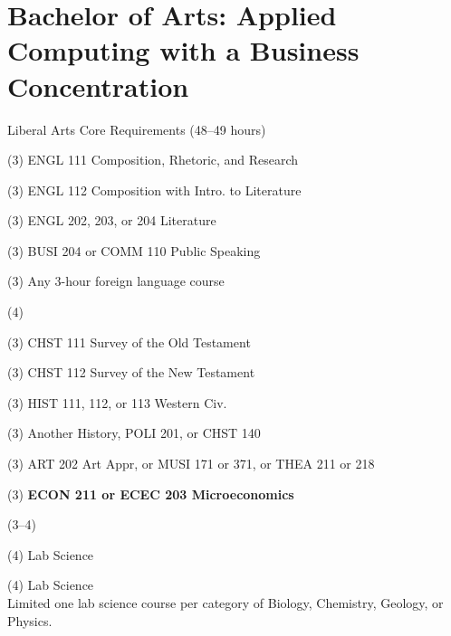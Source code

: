 \label{program:ba-app-bus}%
\section*{Bachelor of Arts: Applied Computing with a Business Concentration}

\begin{reqgroup}{Liberal Arts Core Requirements (48--49 hours)}
\begin{checklist}
\begin{minipage}[t]{0.5\linewidth}
	\item (3) ENGL 111 Composition, Rhetoric, and Research
	\item (3) ENGL 112 Composition with Intro\@. to Literature
	\item (3) ENGL 202, 203, or 204 Literature
	\item (3) BUSI 204 or COMM 110 Public Speaking
	\item (3) Any 3-hour foreign language course
	\item (4) 
	\item (3) CHST 111  Survey of the Old Testament
	\item (3) CHST 112  Survey of the New Testament
	\item (3) HIST 111, 112, or 113 Western Civ.
\end{minipage}
\begin{minipage}[t]{0.5\linewidth}
	\item (3)	Another History, POLI 201, or CHST 140
	\item \raggedright{} (3)	ART 202 Art Appr, or MUSI 171 or 371, or THEA 211 or 218
	\item (3)	\textbf{ECON 211 or ECEC 203 Microeconomics}
	\item (3--4)	
	\item (4)	Lab Science
	\item (4)	Lab Science\\Limited one lab science course per category of Biology, Chemistry,
Geology, or Physics.
\end{minipage}
\end{checklist}
\end{reqgroup}


